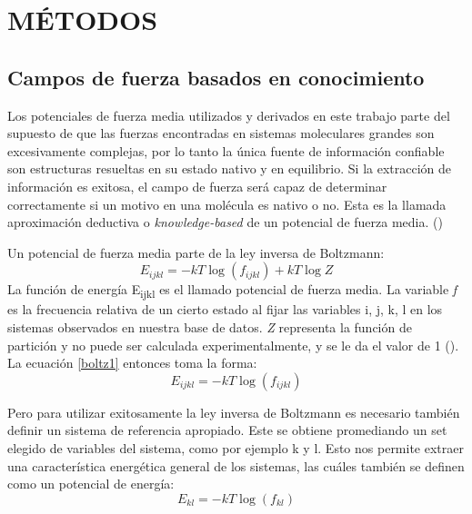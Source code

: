 \newpage
\section*{MÉTODOS}
\par{}
\subsection{Campos de fuerza basados en conocimiento}
\par
Los potenciales de fuerza media utilizados y derivados en este trabajo parte del supuesto de que las
fuerzas encontradas en sistemas moleculares grandes son excesivamente complejas, por lo tanto la 
única fuente de información confiable son estructuras resueltas en su estado nativo y en equilibrio. 
Si la extracción de información es exitosa, el campo de fuerza será capaz de determinar correctamente 
si un motivo en una molécula es nativo o no. 
Esta es la llamada aproximación deductiva o \textit{knowledge-based} de un potencial de fuerza 
media. (\cite{Sippl1993})
\par
Un potencial de fuerza media parte de la ley inversa de Boltzmann:
\begin{equation}
E_{ijkl} = -kT\log(f_{ijkl}) + kT\log Z \label{boltz1}
\end{equation}
La función de energía E\textsubscript{ijkl} es el llamado potencial de fuerza media. 
La variable \textit{f} es la frecuencia relativa de un cierto estado al fijar las variables i, j, k, l en 
los sistemas observados en nuestra base de datos. 
\textit{Z} representa la función de partición y no puede ser calculada experimentalmente, y se le da el 
valor de 1 (\cite{Sippl1993}). 
La ecuación \eqref{boltz1}  entonces toma la forma:
\begin{equation}
E_{ijkl} = -kT\log(f_{ijkl}) \label{boltz2}
\end{equation}
\par
Pero para utilizar exitosamente la ley inversa de Boltzmann es necesario también definir un sistema 
de referencia apropiado. 
Este se obtiene promediando un set elegido de variables del sistema, como por ejemplo k y l.
Esto nos permite extraer una característica energética general de los sistemas, las cuáles también se 
definen como un potencial de energía:
\begin{equation}
E_{kl} = -kT\log(f_{kl}) \label{boltzref}
\end{equation}
\par
